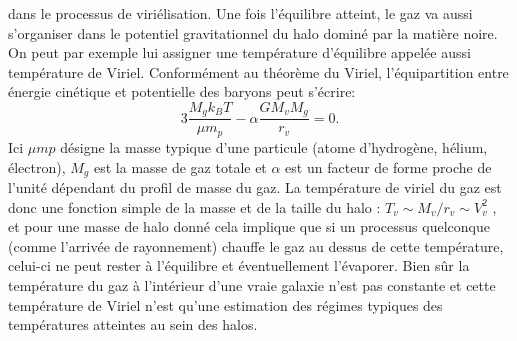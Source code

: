  dans le processus de viriélisation. Une fois l'équilibre atteint, le gaz va aussi s'organiser dans le potentiel gravitationnel du halo dominé par la matière noire. On peut par exemple lui assigner une température d'équilibre appelée aussi température de Viriel. Conformément au théorème du Viriel, l'équipartition entre énergie cinétique et potentielle des baryons peut s'écrire:
\begin{equation}
3\frac{M_gk_B T}{\mu m_p} - \alpha \frac{G M_v M_g}{r_v}=0.
\end{equation}
Ici $\mu mp$ désigne la masse typique d'une particule (atome d'hydrogène, hélium, électron), $M_g$ est la masse de gaz totale et $\alpha$ est un facteur de forme proche de l'unité dépendant du profil de masse du gaz. La température de viriel du gaz est donc une fonction simple de la masse et de la taille du halo : $T_v\sim M_v/r_v \sim V_v^2$ , et pour une masse de halo donné cela implique que si un processus quelconque (comme l'arrivée de rayonnement) chauffe le gaz au dessus de cette température, celui-ci ne peut rester à l'équilibre et éventuellement l'évaporer. Bien sûr la température du gaz à l'intérieur d'une vraie galaxie n'est pas constante et cette température de Viriel n'est qu'une estimation des régimes typiques des températures atteintes au sein des halos.

